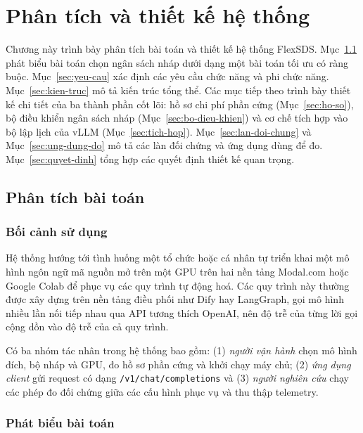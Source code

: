 \chapter{Phân tích và thiết kế hệ thống}
\label{chap:thiet-ke}

Chương này trình bày phân tích bài toán và thiết kế hệ thống FlexSDS. Mục~\ref{sec:phan-tich} phát biểu bài toán chọn ngân sách nháp dưới dạng một bài toán tối ưu có ràng buộc. Mục~\ref{sec:yeu-cau} xác định các yêu cầu chức năng và phi chức năng. Mục~\ref{sec:kien-truc} mô tả kiến trúc tổng thể. Các mục tiếp theo trình bày thiết kế chi tiết của ba thành phần cốt lõi: hồ sơ chi phí phần cứng (Mục~\ref{sec:ho-so}), bộ điều khiển ngân sách nháp (Mục~\ref{sec:bo-dieu-khien}) và cơ chế tích hợp vào bộ lập lịch của vLLM (Mục~\ref{sec:tich-hop}). Mục~\ref{sec:lan-doi-chung} và Mục~\ref{sec:ung-dung-do} mô tả các làn đối chứng và ứng dụng dùng để đo. Mục~\ref{sec:quyet-dinh} tổng hợp các quyết định thiết kế quan trọng.

\section{Phân tích bài toán}
\label{sec:phan-tich}

\subsection{Bối cảnh sử dụng}

Hệ thống hướng tới tình huống một tổ chức hoặc cá nhân tự triển khai một mô hình ngôn ngữ mã nguồn mở trên một GPU trên hai nền tảng Modal.com hoặc Google Colab để phục vụ các quy trình tự động hoá. Các quy trình này thường được xây dựng trên nền tảng điều phối như Dify hay LangGraph, gọi mô hình nhiều lần nối tiếp nhau qua API tương thích OpenAI, nên độ trễ của từng lời gọi cộng dồn vào độ trễ của cả quy trình. 

Có ba nhóm tác nhân trong hệ thống bao gồm: (1) \textit{người vận hành} chọn mô hình đích, bộ nháp và GPU, đo hồ sơ phần cứng và khởi chạy máy chủ; (2) \textit{ứng dụng client} gửi request có dạng \texttt{/v1/chat/completions} và (3) \textit{người nghiên cứu} chạy các phép đo đối chứng giữa các cấu hình phục vụ và thu thập telemetry.

\subsection{Phát biểu bài toán}
\label{subsec:bai-toan}

